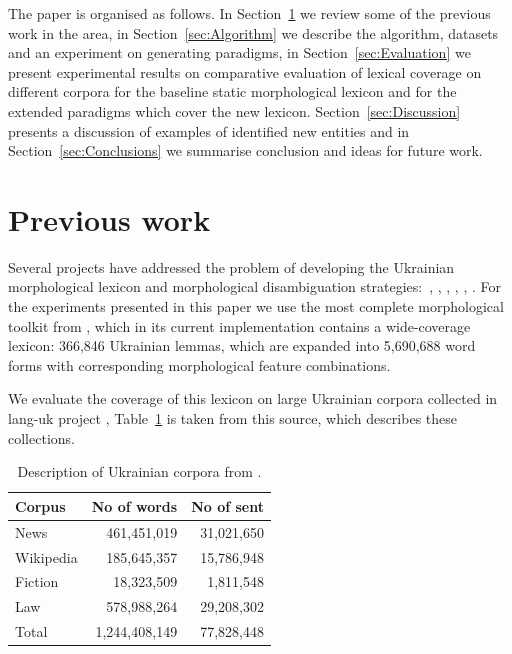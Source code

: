 \documentclass[11pt,a4paper]{article}
\begin{document}
The paper is organised as follows. In Section~\ref{sec:PrevWork} we review some of the previous work in the area, in Section~\ref{sec:Algorithm} we describe the algorithm, datasets and an experiment on generating paradigms, in Section~\ref{sec:Evaluation} we present experimental results on comparative evaluation of lexical coverage on different corpora for the baseline static morphological lexicon and for the extended paradigms which cover the new lexicon. Section~\ref{sec:Discussion} presents a discussion of examples of identified new entities and in Section~\ref{sec:Conclusions} we summarise conclusion and ideas for future work.

\section{Previous work}
\label{sec:PrevWork}

Several projects have addressed the problem of developing the Ukrainian morphological lexicon and morphological disambiguation strategies:~\cite{gryaznukhina-ed-1989}, \cite{gryaznukhina-ed-1999}, \cite{Rysin-Starko-2019}, \cite{kotsyba2009ugtag}, \cite{kotsyba2010multext}, \cite{babych2016ukrainian}. For the experiments presented in this paper we use the most complete morphological toolkit from \cite{Rysin-Starko-2019}, which in its current implementation contains a wide-coverage lexicon: 366,846 Ukrainian lemmas, which are expanded into 5,690,688 word forms with corresponding morphological feature combinations.

We evaluate the coverage of this lexicon on large Ukrainian corpora collected in lang-uk project \cite{Dyomkin-2019}, Table~\ref{lang-uk-corpus-description} is taken from this source, which describes these collections.


\begin{table}[]
	\begin{center}
		\begin{tabular}{|l|rr|}
			\hline \textbf{Corpus} & \textbf{No of words} & \textbf{No of sent} \\ \hline
			News & 461,451,019 & 31,021,650 \\
			Wikipedia & 185,645,357 & 15,786,948 \\
			Fiction & 18,323,509 & 1,811,548 \\
			Law  & 578,988,264 & 29,208,302 \\
			\hline
			Total & 1,244,408,149 &  77,828,448\\
			\hline
		\end{tabular}
	\end{center}
	\caption{\label{lang-uk-corpus-description} Description of Ukrainian corpora from \cite{Dyomkin-2019}. }
\end{table}
\end{document}

